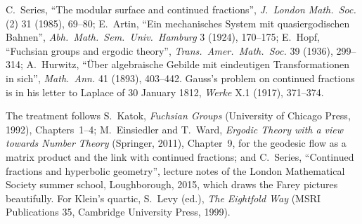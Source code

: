 C.~Series, ``The modular surface and continued fractions'', \emph{J.\ London Math.\ Soc.} (2) 31 (1985), 69--80; E.~Artin, ``Ein mechanisches System mit quasiergodischen Bahnen'', \emph{Abh.\ Math.\
Sem.\ Univ.\ Hamburg} 3 (1924), 170--175; E.~Hopf, ``Fuchsian groups and ergodic theory'', \emph{Trans.\ Amer.\ Math.\ Soc.} 39 (1936), 299--314; A.~Hurwitz, ``\"Uber algebraische Gebilde mit
eindeutigen Transformationen in sich'', \emph{Math.\ Ann.} 41 (1893), 403--442. Gauss's problem on continued fractions is in his letter to Laplace of 30 January 1812, \emph{Werke} X.1 (1917), 371--374.

The treatment follows S.~Katok, \emph{Fuchsian Groups} (University of Chicago Press, 1992), Chapters~1--4; M.~Einsiedler and T.~Ward, \emph{Ergodic Theory with a view towards Number Theory}
(Springer, 2011), Chapter~9, for the geodesic flow as a matrix product and the link with continued fractions; and C.~Series, ``Continued fractions and hyperbolic geometry'', lecture notes of
the London Mathematical Society summer school, Loughborough, 2015, which draws the Farey pictures beautifully. For Klein's quartic, S.~Levy (ed.), \emph{The Eightfold Way} (MSRI
Publications 35, Cambridge University Press, 1999).
